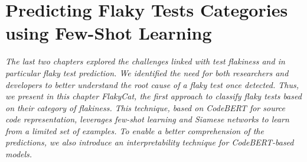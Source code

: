 \chapter{Predicting Flaky Tests Categories using Few-Shot Learning}
\label{chap:flakycat}

\setcounter{minitocdepth}{1}
\justifying
\textit{
The last two chapters explored the challenges linked with test flakiness and in particular flaky test prediction. We identified the need for both researchers and developers to better understand the root cause of a flaky test once detected. Thus, we present in this chapter FlakyCat, the first approach to classify flaky tests based on their category of flakiness. This technique, based on CodeBERT for source code representation, leverages few-shot learning and Siamese networks to learn from a limited set of examples. To enable a better comprehension of the predictions, we also introduce an interpretability technique for CodeBERT-based models.\\
}









